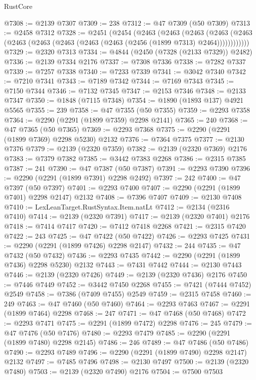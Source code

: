 \begin{lexlean}{RustCore}
\begin{coremodule}
@7308 := @2139 @7307
@7309 := 238
@7312 := @47 @7309 (@50 @7309)
@7313 := @2458 @7312
@7328 := @2451
    (@2454
      (@2463
        (@2463
          (@2463
            (@2463 (@2463 (@2463 (@2463 (@2463 (@2463 (@2463 (@2456 (@1899 @7313) @2464))))))))))))
@7329 := @2320 @7313
@7334 := @4844 (@2450 (@7328 (@2133 @7329)) @2482)
@7336 := @2139 @7334 @2176
@7337 := @7308 @7336
@7338 := @7282 @7337
@7339 := @7257 @7338
@7340 := @7233 @7339
@7341 := @3042 @7340
@7342 := @7210 @7341
@7343 := @7189 @7342
@7344 := @7169 @7343
@7345 := @7150 @7344
@7346 := @7132 @7345
@7347 := @2153 @7346
@7348 := @2133 @7347
@7350 := @1848 (@7115 @7348)
@7354 := @1890 (@1893 @137) @4921 @5565
@7355 := 239
@7358 := @47 @7355 (@50 @7355)
@7359 := @2293 @7358
@7364 := @2290 (@2291 (@1899 @7359) @2298 @2141)
@7365 := 240
@7368 := @47 @7365 (@50 @7365)
@7369 := @2293 @7368
@7375 := @2290 (@2291 (@1899 @7369) @2298 @5230) @2132
@7376 := @7364 @7375
@7377 := @2130 @7376
@7379 := @2139 (@2320 @7359)
@7382 := @2139 (@2320 @7369) @2176
@7383 := @7379 @7382
@7385 := @3442 @7383 @2268
@7386 := @2315 @7385
@7387 := 241
@7390 := @47 @7387 (@50 @7387)
@7391 := @2293 @7390
@7396 := @2290 (@2291 (@1899 @7391) @2298 @2492)
@7397 := 242
@7400 := @47 @7397 (@50 @7397)
@7401 := @2293 @7400
@7407 := @2290 (@2291 (@1899 @7401) @2298 @2147) @2132
@7408 := @7396 @7407
@7409 := @2130 @7408
@7410 := LexLeanTarget.RustSyntax.Item.natLt
@7412 := @2134 (@2316 @7410)
@7414 := @2139 (@2320 @7391)
@7417 := @2139 (@2320 @7401) @2176
@7418 := @7414 @7417
@7420 := @7412 @7418 @2268
@7421 := @2315 @7420
@7422 := 243
@7425 := @47 @7422 (@50 @7422)
@7426 := @2293 @7425
@7431 := @2290 (@2291 (@1899 @7426) @2298 @2147)
@7432 := 244
@7435 := @47 @7432 (@50 @7432)
@7436 := @2293 @7435
@7442 := @2290 (@2291 (@1899 @7436) @2298 @5230) @2132
@7443 := @7431 @7442
@7444 := @2130 @7443
@7446 := @2139 (@2320 @7426)
@7449 := @2139 (@2320 @7436) @2176
@7450 := @7446 @7449
@7452 := @3442 @7450 @2268
@7455 := @7421 (@7444 @7452) @2549
@7458 := @7386 (@7409 @7455) @2549
@7459 := @2315 @7458
@7460 := 249
@7463 := @47 @7460 (@50 @7460)
@7464 := @2293 @7463
@7467 := @2291 (@1899 @7464) @2298
@7468 := 247
@7471 := @47 @7468 (@50 @7468)
@7472 := @2293 @7471
@7475 := @2291 (@1899 @7472) @2298
@7476 := 245
@7479 := @47 @7476 (@50 @7476)
@7480 := @2293 @7479
@7485 := @2290 (@2291 (@1899 @7480) @2298 @2145)
@7486 := 246
@7489 := @47 @7486 (@50 @7486)
@7490 := @2293 @7489
@7496 := @2290 (@2291 (@1899 @7490) @2298 @2147) @2132
@7497 := @7485 @7496
@7498 := @2130 @7497
@7500 := @2139 (@2320 @7480)
@7503 := @2139 (@2320 @7490) @2176
@7504 := @7500 @7503

\end{coremodule}
\end{lexlean}
